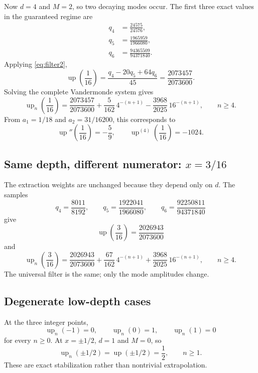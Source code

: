 \documentclass[11pt]{article}
\newcommand{\upf}{\operatorname{up}}
\begin{document}
Now \(d=4\) and \(M=2\), so two decaying modes occur.  The first three exact
values in the guaranteed regime are
\begin{align*}
 q_4&=\frac{24575}{24576},\\
 q_5&=\frac{1965959}{1966080},\\
 q_6&=\frac{94365509}{94371840}.
\end{align*}
Applying \cref{eq:filter2},
\begin{equation}\label{eq:example-sixteenth-limit}
 \upf\!\left(\frac1{16}\right)
 =\frac{q_4-20q_5+64q_6}{45}
 =\frac{2073457}{2073600}.
\end{equation}
Solving the complete Vandermonde system gives
\begin{equation}\label{eq:example-sixteenth}
 \boxed{\displaystyle
 \upf_n\!\left(\frac1{16}\right)
 =\frac{2073457}{2073600}
  +\frac{5}{162}\,4^{-(n+1)}
  -\frac{3968}{2025}\,16^{-(n+1)},
 \qquad n\ge4.}
\end{equation}
From \(a_1=1/18\) and \(a_2=31/16200\), this corresponds to
\[
 \upf''\!\left(\frac1{16}\right)=-\frac59,
 \qquad
 \upf^{(4)}\!\left(\frac1{16}\right)=-1024.
\]

\subsection{Same depth, different numerator: \(x=3/16\)}

The extraction weights are unchanged because they depend only on \(d\).  The
samples
\[
 q_4=\frac{8011}{8192},\qquad
 q_5=\frac{1922041}{1966080},\qquad
 q_6=\frac{92250811}{94371840}
\]
give
\begin{equation}\label{eq:example-three-sixteenth}
 \upf\!\left(\frac3{16}\right)=\frac{2026943}{2073600}
\end{equation}
and
\begin{equation}\label{eq:example-three-sixteenth-sequence}
 \upf_n\!\left(\frac3{16}\right)
 =\frac{2026943}{2073600}
  +\frac{67}{162}\,4^{-(n+1)}
  +\frac{3968}{2025}\,16^{-(n+1)},
 \qquad n\ge4.
\end{equation}
The universal filter is the same; only the mode amplitudes change.

\subsection{Degenerate low-depth cases}

At the three integer points,
\[
 \upf_n(-1)=0,\qquad \upf_n(0)=1,\qquad \upf_n(1)=0
\]
for every \(n\ge0\).  At \(x=\pm1/2\), \(d=1\) and \(M=0\), so
\[
 \upf_n(\pm1/2)=\upf(\pm1/2)=\frac12,
 \qquad n\ge1.
\]
These are exact stabilization rather than nontrivial extrapolation.
\end{document}
